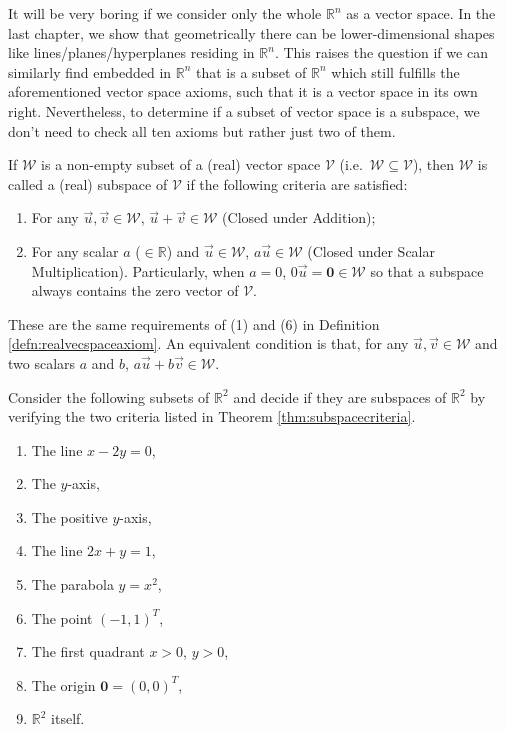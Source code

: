 It will be very boring if we consider only the whole $\mathbb{R}^n$ as a vector space. In the last chapter, we show that geometrically there can be lower-dimensional shapes like lines/planes/hyperplanes residing in $\mathbb{R}^n$. This raises the question if we can similarly find  embedded in $\mathbb{R}^n$ that is a subset of $\mathbb{R}^n$ which still fulfills the aforementioned vector space axioms, such that it is a vector space in its own right. Nevertheless, to determine if a subset of vector space is a subspace, we don't need to check all ten axioms but rather just two of them.
\begin{thm}
\label{thm:subspacecriteria}
If $\mathcal{W}$ is a non-empty subset of a (real) vector space $\mathcal{V}$ (i.e.\ $\mathcal{W} \subseteq \mathcal{V}$), then $\mathcal{W}$ is called a (real) subspace of $\mathcal{V}$ if the following criteria are satisfied:
\begin{enumerate}
\item For any $\vec{u}, \vec{v} \in \mathcal{W}$, $\vec{u} + \vec{v} \in \mathcal{W}$ (Closed under Addition);
\item For any scalar $a$ ($\in \mathbb{R}$) and $\vec{u} \in \mathcal{W}$, $a\vec{u} \in \mathcal{W}$ (Closed under Scalar Multiplication). Particularly, when $a = 0$, $0\vec{u} = \textbf{0} \in \mathcal{W}$ so that a subspace always contains the zero vector of $\mathcal{V}$.
\end{enumerate}
These are the same requirements of (1) and (6) in Definition \ref{defn:realvecspaceaxiom}. An equivalent condition is that, for any $\vec{u}, \vec{v} \in \mathcal{W}$ and two scalars $a$ and $b$, $a\vec{u} + b\vec{v} \in \mathcal{W}$.
\end{thm}
\begin{exmp}
Consider the following subsets of $\mathbb{R}^2$ and decide if they are subspaces of $\mathbb{R}^2$ by verifying the two criteria listed in Theorem \ref{thm:subspacecriteria}.
\begin{enumerate}[label=(\alph*)]
\item The line $x - 2y = 0$,
\item The $y$-axis,
\item The positive $y$-axis,
\item The line $2x + y = 1$,
\item The parabola $y = x^2$,
\item The point $(-1,1)^T$,
\item The first quadrant $x > 0$, $y > 0$,
\item The origin $\textbf{0} = (0,0)^T$,
\item $\mathbb{R}^2$ itself.
\end{enumerate}
\end{exmp}
